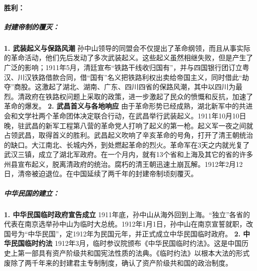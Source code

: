 \begin{enumerate}
		\paragraph{胜利：}
			\subparagraph{封建帝制的覆灭：}
				\textbf{1. 武装起义与保路风潮} 孙中山领导的同盟会不仅提出了革命纲领，而且从事实际的革命活动，他们先后发动了多次武装起义。这些起义虽然相继失败，但是产生了广泛的影响；1911年5月，清廷宣布“铁路干线收归国有”，并与四国银行团订立粤汉、川汉铁路借款合同，借“国有”名义把铁路利权出卖给帝国主义，同时借此“劫夺”商股。这激起了湖北、湖南、广东、四川四省的保路风潮，其中以四川为最烈。清政府在铁路权问题上采取的政策，进一步激起了民众的愤慨和反抗，加速了革命的爆发。
				\textbf{2. 武昌首义与各地响应} 由于革命形势已经成熟，湖北新军中的共进会和文学社两个革命团体决定联合行动，在武昌举行武装起义。1911年10月10日晚，驻武昌的新军工程第八营的革命党人打响了起义的第一枪。起义军一夜之间就占领武昌，取得首义的胜利。武昌起义吹响了辛亥革命的号角，打开了清王朝统治的缺口。大江南北、长城内外，到处燃起革命的烈火。革命军在3天之内就光复了武汉三镇，成立了湖北军政府。在一个月内，就有13个省和上海及其它的省的许多州县宣布起义，脱离清政府的统治。腐朽的清王朝迅速土崩瓦解。1912年2月12日，清帝被迫退位。在中国延续了两千年的封建帝制顷刻覆灭。
			\subparagraph{中华民国的建立：}
				\textbf{1. 中华民国临时政府宣告成立} 1911年底，孙中山从海外回到上海。“独立”各省的代表在南京选举孙中山为临时大总统。1912年1月1日，孙中山在南京宣誓就职，改国号为“中华民国”，定1912年为民国元年，并正式成立中华民国临时政府。
				\textbf{2. 中华民国临时约法} 1912年3月，临时参议院颁布《中华民国临时约法》。这是中国历史上第一部具有资产阶级共和国宪法性质的法典。《临时约法》以根本大法的形式废除了两千年来的封建君主专制制度，确认了资产阶级共和国的政治制度。	

\end{enumerate}
